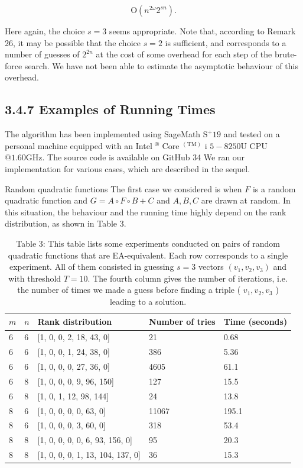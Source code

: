 \documentclass[10pt]{article}
\begin{document}
$$
\mathrm{O}\left(n^{2 \omega} 2^{s n}\right) .
$$

Here again, the choice $s=3$ seems appropriate. Note that, according to Remark 26, it may be possible that the choice $s=2$ is sufficient, and corresponds to a number of guesses of $2^{2 n}$ at the cost of some overhead for each step of the brute-force search. We have not been able to estimate the asymptotic behaviour of this overhead.

\subsection*{3.4.7 Examples of Running Times}
The algorithm has been implemented using SageMath $\mathrm{S}^{+} 19$ and tested on a personal machine equipped with an Intel ${ }^{\circledR}$ Core $^{(\mathrm{TM})}$ i $5-8250 \mathrm{U}$ CPU $@ 1.60 \mathrm{GHz}$. The source code is available on GitHub 34 We ran our implementation for various cases, which are described in the sequel.

Random quadratic functions The first case we considered is when $F$ is a random quadratic function and $G=A \circ F \circ B+C$ and $A, B, C$ are drawn at random. In this situation, the behaviour and the running time highly depend on the rank distribution, as shown in Table 3.

\begin{table}[h]
\begin{center}
\begin{tabular}{|l|l|l|l|l|}
\hline
$m$ & $n$ & Rank distribution & Number of tries & Time (seconds) \\
\hline
6 & 6 & [1, 0, 0, 2, 18, 43, 0] & 21 & 0.68 \\
\hline
6 & 6 & [1, 0, 0, 1, 24, 38, 0] & 386 & 5.36 \\
\hline
6 & 6 & [1, 0, 0, 0, 27, 36, 0] & 4605 & 61.1 \\
\hline
6 & 8 & [1, 0, 0, 0, 9, 96, 150] & 127 & 15.5 \\
\hline
6 & 8 & [1, 0, 1, 12, 98, 144] & 24 & 13.8 \\
\hline
8 & 6 & [1, 0, 0, 0, 0, 63, 0] & 11067 & 195.1 \\
\hline
8 & 6 & [1, 0, 0, 0, 3, 60, 0] & 318 & 53.4 \\
\hline
8 & 8 & [1, 0, 0, 0, 0, 6, 93, 156, 0] & 95 & 20.3 \\
\hline
8 & 8 & [1, 0, 0, 0, 1, 13, 104, 137, 0] & 36 & 15.3 \\
\hline
\end{tabular}
\captionsetup{labelformat=empty}
\caption{Table 3: This table lists some experiments conducted on pairs of random quadratic functions that are EA-equivalent. Each row corresponds to a single experiment. All of them consisted in guessing $s=3$ vectors $\left(v_{1}, v_{2}, v_{3}\right)$ and with threshold $T=10$. The fourth column gives the number of iterations, i.e. the number of times we made a guess before finding a triple ( $v_{1}, v_{2}, v_{3}$ ) leading to a solution.}
\end{center}
\end{table}
\end{document}
